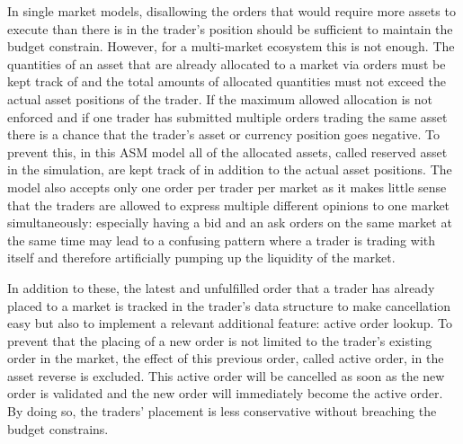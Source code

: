 In single market models, disallowing the orders that would require more assets to execute
than there is in the trader's position should be sufficient to maintain the budget constrain. 
However, for a multi-market ecosystem this is not enough. The quantities of an asset 
that are already allocated to a market via orders must be kept track of and the total amounts of 
allocated quantities must not exceed the actual asset positions of the trader. If the maximum allowed 
allocation is not enforced and if one trader has submitted multiple orders trading the same asset
there is a chance that the trader's asset or currency position goes negative. 
To prevent this, in this ASM model all of the allocated assets, called reserved asset 
in the simulation, are kept track of in addition to the actual asset positions. The model also
accepts only one order per trader per market as it makes little sense that
the traders are allowed to express multiple different opinions to one market 
simultaneously: especially having a bid and an ask orders on the same market
at the same time may lead to a confusing pattern where a trader is trading with
itself and therefore artificially pumping up the liquidity of the market. 

In addition to these, the latest and unfulfilled order that a trader has already placed
to a market is tracked in the trader's data structure to make cancellation easy
but also to implement a relevant additional feature: active order lookup. To prevent that
the placing of a new order is not limited to the trader's existing order in the market,
the effect of this previous order, called active order, in the asset reverse is excluded. 
This active order will be cancelled as soon as the new order is validated and the new order
will immediately become the active order. By doing so, the traders' placement is less 
conservative without breaching the budget constrains.


